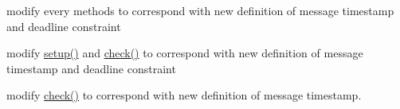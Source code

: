 
\begin{DoxyRefList}
\item[\label{todo__todo000003}%
\hypertarget{todo__todo000003}{}%
클래스 \hyperlink{classConstraintPassingManager__PB}{Constraint\+Passing\+Manager\+\_\+\+PB} ]modify every methods to correspond with new definition of message timestamp and deadline constraint  
\item[\label{todo__todo000002}%
\hypertarget{todo__todo000002}{}%
클래스 \hyperlink{classDeadlineMonitor__PB}{Deadline\+Monitor\+\_\+\+PB} ]modify \hyperlink{classDeadlineMonitor__PB_a6456b87d4c185b8a974f71cc7e729d83}{setup()} and \hyperlink{classDeadlineMonitor__PB_a7debcade9bbf07add3752aa980bc3b19}{check()} to correspond with new definition of message timestamp and deadline constraint  
\item[\label{todo__todo000001}%
\hypertarget{todo__todo000001}{}%
클래스 \hyperlink{classFreshnessMonitor__IP}{Freshness\+Monitor\+\_\+\+IP} ]modify \hyperlink{classFreshnessMonitor__IP_a0527f0f908800c340be5c987e699d0c2}{check()} to correspond with new definition of message timestamp. 
\end{DoxyRefList}